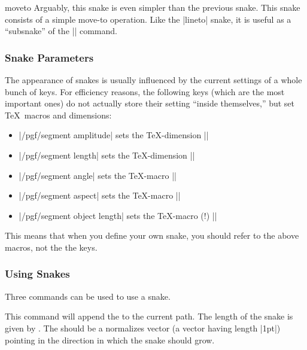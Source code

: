 \begin{snake}{moveto}
  Arguably, this snake is even simpler than the previous snake. This
  snake consists of a simple move-to operation. Like the |lineto|
  snake, it is useful as a ``subsnake'' of the |\pgfsnakesto|
  command. 
\end{snake}


\subsubsection{Snake Parameters}

The appearance of snakes is usually influenced by the current settings
of a whole bunch of keys. For efficiency reasons, the following keys
(which are the most important ones) do not actually store their
setting ``inside themselves,'' but set \TeX\ macros and dimensions:
\begin{itemize}
\item |/pgf/segment amplitude| sets the \TeX-dimension |\pgfsnakesegmentamplitude|
\item |/pgf/segment length| sets the \TeX-dimension |\pgfsnakesegmentlength|
\item |/pgf/segment angle| sets the \TeX-macro |\pgfsnakesegmentangle|
\item |/pgf/segment aspect| sets the \TeX-macro   |\pgfsnakesegmentaspect|
\item |/pgf/segment object length| sets the \TeX-macro (!) |\pgfsnakesegmentobjectlength|
\end{itemize}

This means that when you define your own snake, you should refer to
the above macros, not the the keys.



\subsubsection{Using Snakes}

Three commands can be used to use a snake.

\begin{command}{\pgfpathsnakealongvector{}}
  This command will append the  to the current path. The
  length of the snake is given by . The 
  should be a normalizes vector (a vector having length |1pt|)
  pointing in the direction in which the snake should grow.
\begin{codeexample}[]
\end{codeexample}
\end{command}

